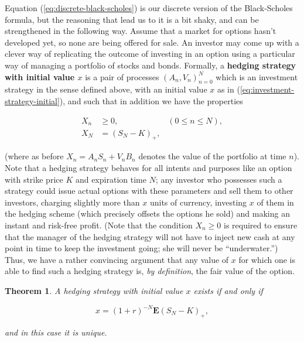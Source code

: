 \documentclass[11pt]{report}
\theoremstyle{plain}
\newtheorem{thm}{Theorem}[chapter]
\theoremstyle{definition}
\begin{document}
Equation (\ref{eq:discrete-black-scholes}) is our discrete version of the Black-Scholes formula, but the reasoning that lead us to it is a bit shaky, and can be strengthened in the following way. Assume that a market for options hasn't developed yet, so none are being offered for sale. An investor may come up with a clever way of replicating the outcome of investing in an option using a particular way of managing a portfolio of stocks and bonds. Formally, a \textbf{hedging strategy with initial value $x$} is a pair of processes $(A_n,V_n)_{n=0}^N$ which is an investment strategy in the sense defined above, with an initial value $x$ as in (\ref{eq:investment-strategy-initial}), and such that in addition we have the properties

\begin{align*}
X_n &\ge 0,  \qquad \qquad \qquad (0\le n\le N), \\
X_N &= (S_N-K)_+,
\end{align*}

(where as before $X_n = A_n S_n + V_n B_n$ denotes the value of the portfolio at time $n$). Note that a hedging strategy behaves for all intents and purposes like an option with strike price $K$ and expiration time $N$; any investor who possesses such a strategy could issue actual options with these parameters and sell them to other investors, charging slightly more than $x$ units of currency, investing $x$ of them in the hedging scheme (which precisely offsets the options he sold) and making an instant and risk-free profit. (Note that the condition $X_n\ge0$ is required to ensure that the manager of the hedging strategy will not have to inject new cash at any point in time to keep the investment going; she will never be ``underwater.'') Thus, we have a rather convincing argument that any value of $x$ for which one is able to find such a hedging strategy is, \emph{by definition}, the fair value of the option.

\begin{thm}
A hedging strategy with initial value $x$ exists if and only if

\begin{equation*} \tag{12}\label{eq:hedging-strategy-condition}
x=(1+r)^{-N}\mathbf{E}(S_N-K)_+,
\end{equation*}

and in this case it is unique.
\end{thm}
\end{document}
